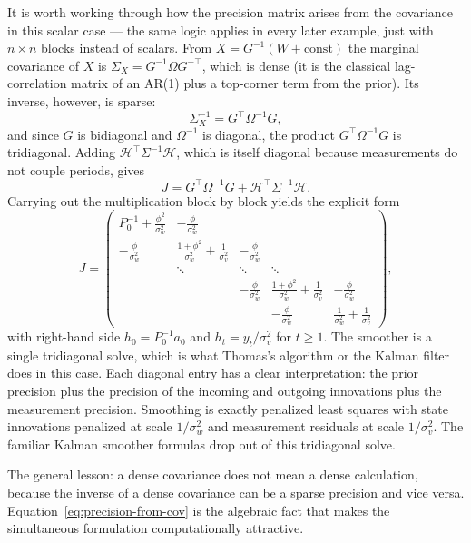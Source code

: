 \documentclass[11pt]{article}
\begin{document}
It is worth working through how the precision matrix arises from the
covariance in this scalar case --- the same logic applies in every
later example, just with $n\times n$ blocks instead of scalars.  From
$X = G^{-1}(W + \text{const})$ the marginal covariance of $X$ is
$\Sigma_X = G^{-1}\Omega G^{-\top}$, which is dense (it is the
classical lag-correlation matrix of an AR(1) plus a top-corner term
from the prior).  Its inverse, however, is sparse:
\begin{equation}
\Sigma_X^{-1} = G^\top\Omega^{-1} G,
\label{eq:precision-from-cov}
\end{equation}
and since $G$ is bidiagonal and $\Omega^{-1}$ is diagonal, the product
$G^\top\Omega^{-1}G$ is tridiagonal.  Adding $\mathcal H^\top\Sigma^{-1}\mathcal H$,
which is itself diagonal because measurements do not couple
periods, gives
\begin{equation}
J = G^\top\Omega^{-1}G + \mathcal H^\top\Sigma^{-1}\mathcal H.
\end{equation}
Carrying out the multiplication block by block yields the explicit
form
\begin{equation}
J=\begin{pmatrix}
P_0^{-1}+\tfrac{\phi^2}{\sigma_w^2} & -\tfrac{\phi}{\sigma_w^2} & & & \\
-\tfrac{\phi}{\sigma_w^2} & \tfrac{1+\phi^2}{\sigma_w^2}+\tfrac{1}{\sigma_v^2} & -\tfrac{\phi}{\sigma_w^2} & & \\
 & \ddots & \ddots & \ddots & \\
 & & -\tfrac{\phi}{\sigma_w^2} & \tfrac{1+\phi^2}{\sigma_w^2}+\tfrac{1}{\sigma_v^2} & -\tfrac{\phi}{\sigma_w^2}\\
 & & & -\tfrac{\phi}{\sigma_w^2} & \tfrac{1}{\sigma_w^2}+\tfrac{1}{\sigma_v^2}
\end{pmatrix},
\end{equation}
with right-hand side $h_0=P_0^{-1}a_0$ and
$h_t=y_t/\sigma_v^2$ for $t\ge 1$.  The smoother is a single
tridiagonal solve, which is what Thomas's algorithm or the Kalman
filter does in this case.  Each diagonal entry has a clear
interpretation: the prior precision plus the precision of the
incoming and outgoing innovations plus the measurement precision.
Smoothing is exactly penalized least squares with state innovations
penalized at scale $1/\sigma_w^2$ and measurement residuals at scale
$1/\sigma_v^2$.  The familiar Kalman smoother formulas drop out of
this tridiagonal solve.

The general lesson: a dense covariance does not mean a dense
calculation, because the inverse of a dense covariance can be a sparse
precision and vice versa.  Equation~\eqref{eq:precision-from-cov} is
the algebraic fact that makes the simultaneous formulation
computationally attractive.
\end{document}
